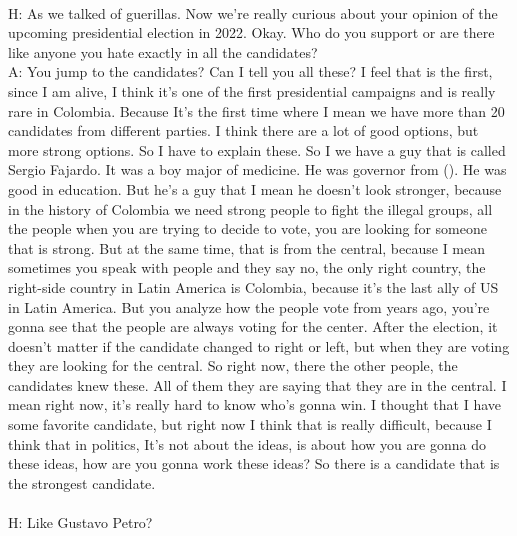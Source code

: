 \documentclass{phyasgn}\usepackage{nag}
\begin{document}
\\
H: As we talked of guerillas. Now we're really curious about your opinion of the upcoming presidential election in 2022. Okay. Who do you support or are there like anyone you hate exactly in all the candidates?\\
A: You jump to the candidates? Can I tell you all these? I feel that is the first, since I am alive, I think it's one of the first presidential campaigns and is really rare in Colombia. Because It’s the first time where I mean we have more than 20 candidates from different parties. I think there are a lot of good options, but more strong options. So I have to explain these. So I we have a guy that is called Sergio Fajardo. It was a boy major of medicine. He was governor from (). He was good in education. But he's a guy that I mean he doesn't look stronger, because in the history of Colombia we need strong people to fight the illegal groups, all the people when you are trying to decide to vote, you are looking for someone that is strong. But at the same time, that is from the central, because I mean sometimes you speak with people and they say no, the only right country, the right-side country in Latin America is Colombia, because it's the last ally of US in Latin America. But you analyze how the people vote from years ago, you're gonna see that the people are always voting for the center. After the election, it doesn't matter if the candidate changed to right or left, but when they are voting they are looking for the central. So right now, there the other people, the candidates knew these. All of them they are saying that they are in the central. I mean right now, it's really hard to know who's gonna win. I thought that I have some favorite candidate, but right now I think that is really difficult, because I think that in politics, It's not about the ideas, is about how you are gonna do these ideas, how are you gonna work these ideas? So there is a candidate that is the strongest candidate. \\
\\
H: Like Gustavo Petro?\\
\end{document}

